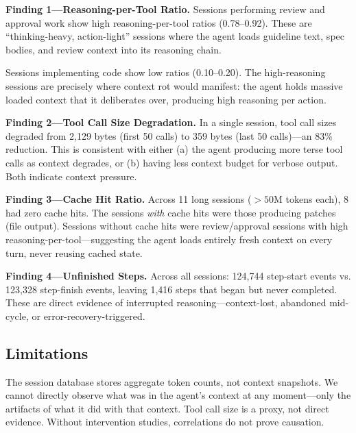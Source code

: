 \documentclass[11pt,a4paper]{article}
\begin{document}
\textbf{Finding 1---Reasoning-per-Tool Ratio.} Sessions performing review and approval work show high reasoning-per-tool ratios (0.78--0.92). These are ``thinking-heavy, action-light'' sessions where the agent loads guideline text, spec bodies, and review context into its reasoning chain.

\begin{center}
\end{center}

Sessions implementing code show low ratios (0.10--0.20). The high-reasoning sessions are precisely where context rot would manifest: the agent holds massive loaded context that it deliberates over, producing high reasoning per action.

\textbf{Finding 2---Tool Call Size Degradation.} In a single session, tool call sizes degraded from 2,129 bytes (first 50 calls) to 359 bytes (last 50 calls)---an 83\% reduction. This is consistent with either (a) the agent producing more terse tool calls as context degrades, or (b) having less context budget for verbose output. Both indicate context pressure.

\textbf{Finding 3---Cache Hit Ratio.} Across 11 long sessions ($>50$M tokens each), 8 had zero cache hits. The sessions \emph{with} cache hits were those producing patches (file output). Sessions without cache hits were review/approval sessions with high reasoning-per-tool---suggesting the agent loads entirely fresh context on every turn, never reusing cached state.

\textbf{Finding 4---Unfinished Steps.} Across all sessions: 124,744 step-start events vs. 123,328 step-finish events, leaving 1,416 steps that began but never completed. These are direct evidence of interrupted reasoning---context-lost, abandoned mid-cycle, or error-recovery-triggered.

\subsection{Limitations}
The session database stores aggregate token counts, not context snapshots. We cannot directly observe what was in the agent's context at any moment---only the artifacts of what it did with that context. Tool call size is a proxy, not direct evidence. Without intervention studies, correlations do not prove causation.
\end{document}
